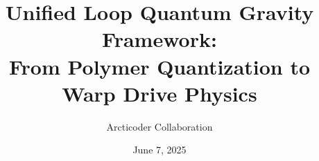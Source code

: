 \documentclass[11pt]{article}
\begin{document}
\title{Unified Loop Quantum Gravity Framework:\\From Polymer Quantization to Warp Drive Physics}
\author{Arcticoder Collaboration}
\date{June 7, 2025}
\maketitle

\tableofcontents
\newpage


\newpage


\newpage


\newpage


\newpage


\newpage


\newpage


\newpage


\newpage


\newpage


\newpage


\newpage


\newpage


\newpage


\newpage


\newpage


\newpage


\newpage


\newpage


\newpage


\newpage


\newpage


\newpage


\newpage


\newpage


\newpage


\newpage


\newpage
\end{document}
